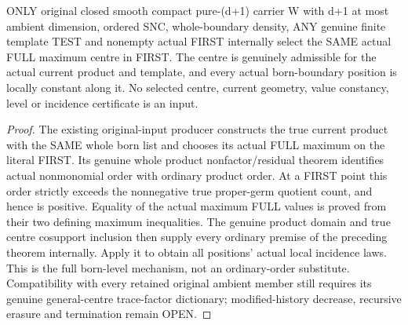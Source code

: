 \begin{theorem}
\label{hir:sharp-original-dynamic-first-full-born-incidence}
\leanok
ONLY original closed smooth compact pure-(d+1) carrier W with d+1 at most
ambient dimension, ordered SNC, whole-boundary density, ANY genuine finite
template TEST and nonempty actual FIRST internally select the SAME actual
FULL maximum centre in FIRST. The centre is genuinely admissible for the
actual current product and template, and every actual born-boundary position
is locally constant along it. No selected centre, current geometry, value
constancy, level or incidence certificate is an input.
\end{theorem}
\begin{proof}
The existing original-input producer constructs the true current product
with the SAME whole born list and chooses its actual FULL maximum on the
literal FIRST. Its genuine whole product nonfactor/residual theorem identifies
actual nonmonomial order with ordinary product order. At a FIRST point this
order strictly exceeds the nonnegative true proper-germ quotient count,
and hence is positive. Equality of the actual maximum FULL values is proved
from their two defining maximum inequalities. The genuine product domain
and true centre cosupport inclusion then supply every ordinary premise of
the preceding theorem internally. Apply it to obtain all positions' actual
local incidence laws. This is the full born-level mechanism, not an
ordinary-order substitute. Compatibility with every retained original
ambient member still requires its genuine general-centre trace-factor
dictionary; modified-history decrease, recursive erasure and termination
remain OPEN.
\end{proof}
